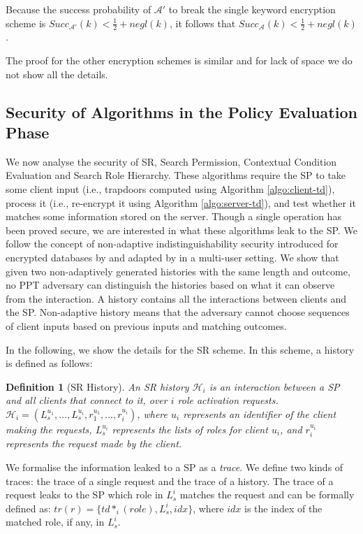 \documentclass[final,5p,times,twocolumn]{elsarticle}
\newtheorem{definition}{Definition}
\begin{document}
Because the success probability of $\mathcal{A}'$ to break the single keyword encryption scheme is $Succ_{\mathcal{A}'}(k) < \frac{1}{2} + negl(k)$, it follows that $Succ_{\mathcal{A}}(k) < \frac{1}{2} + negl(k)$.

The proof for the other encryption schemes is similar and for lack of space we do not show all the details.

\subsection{Security of Algorithms in the Policy Evaluation Phase}
We now analyse the security of SR, Search Permission, Contextual Condition Evaluation and Search Role Hierarchy. These algorithms require the SP to take some client input (i.e., trapdoors computed using Algorithm \ref{algo:client-td}), process it (i.e., re-encrypt it using Algorithm \ref{algo:server-td}), and test whether it matches some information stored on the server. Though a single operation has been proved secure, we are interested in what these algorithms leak to the SP. We follow the concept of non-adaptive indistinguishability security introduced for encrypted databases by \cite{Curtmola2006} and adapted by \cite{Dong2011} in a multi-user setting. We show that given two non-adaptively generated histories with the same length and outcome, no PPT adversary can distinguish the histories based on what it can observe from the interaction. A history contains all the interactions between clients and the SP. Non-adaptive history means that the adversary cannot choose sequences of client inputs based on previous inputs and matching outcomes.

In the following, we show the details for the SR scheme. In this scheme, a history is defined as follows:

\begin{definition}[SR History]
An SR history $\mathcal{H}_i$ is an interaction between a SP and all clients that connect to it, over $i$ role activation requests. $\mathcal{H}_i=(L_s^{u_1},\ldots, L_s^{u_i},r_{1}^{u_1},\ldots,r_{i}^{u_i})$, where $u_i$ represents an identifier of the client making the requests, $L_s^{u_i}$ represents the lists of roles for client $u_i$, and $r_{i}^{u_i}$ represents the request made by the client.
\end{definition}

We formalise the information leaked to a SP as a \textit{trace}. We define two kinds of traces: the trace of a single request and the trace of a history. The trace of a request leaks to the SP which role in $L_s^{i}$ matches the request and can be formally defined as: $tr(r)=\{td*_i(role), L_s^{i}, idx\}$, where $idx$ is the index of the matched role, if any, in $L_s^{i}$.
\end{document}
